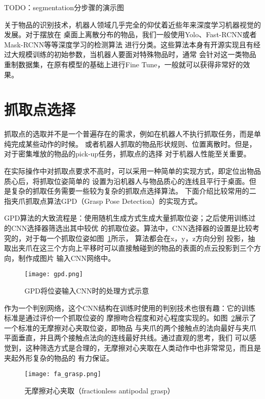 TODO：segmentation分步骤的演示图

关于物品的识别技术，机器人领域几乎完全的仰仗着近些年来深度学习机器视觉的发展。对于摆放在
桌面上离散分布的物品，我们一般使用Yolo、Fast-RCNN或者Mask-RCNN等等深度学习的检测算法
进行分类。这些算法本身有开源实现且有经过大规模训练的初始参数，当机器人要面对特殊物品时，通常
会针对这一类物品重制数据集，在原有模型的基础上进行Fine Tune，一般就可以获得非常好的效果。



\section{抓取点选择}

抓取点的选取并不是一个普遍存在的需求，例如在机器人不执行抓取任务，而是单纯完成某些动作的时候。
或者机器人抓取的物品形状规则、位置离散时。但是，对于密集堆放的物品的pick-up任务，抓取点的选择
对于机器人性能至关重要。

在实际操作中对抓取点要求不高时，可以采用一种简单的实现方式，即定位出物品质心后，将抓取位姿简单的
设置为沿机器人与物品质心的连线且平行于桌面。但是复杂的抓取任务需要一些较为复杂的抓取点选择算法。
下面介绍比较常用的二指夹爪抓取点算法GPD（Grasp Pose Detection）\cite{ten2017grasp}的实现方式。

GPD算法的大致流程是：使用随机生成方式生成大量抓取位姿；之后使用训练过的CNN选择器筛选出其中较优
的抓取位姿。算法中，CNN选择器的设置是比较考究的，对于每一个抓取位姿如图~\ref{fig:gpd}所示，
算法都会在x，y，z方向分别
投影，抽取出夹爪在这三个方向上平移时可以直接触碰到的物品的表面的点云投影到三个方向，制作成图片
输入CNN网络中。

\begin{figure}[h] %
  \centering
  \texttt{[image: gpd.png]}
  \caption{GPD将位姿输入CNN时的处理方式示意}
  \label{fig:gpd}
\end{figure}

作为一个判别网络，这个CNN结构在训练时使用的判别技术也很有趣：它的训练标准是通过评价一个抓取位姿的
摩擦吻合程度和对心程度实现的。如图~\ref{fig:fa_grasp}展示了一个标准的无摩擦对心夹取位姿，即物品
与夹爪的两个接触点的法向最好与夹爪平面垂直，并且两个接触点法向的连线最好共线。通过直观的思考，我们
可以感觉到，这种筛选方式是合理的，无摩擦对心夹取在人类动作中也非常常见，而且是夹起外形复杂的物品的
有力保证。


\begin{figure}[h] %
  \centering
  \texttt{[image: fa\_grasp.png]}
  \caption{无摩擦对心夹取（fractionless antipodal grasp）}
  \label{fig:fa_grasp}
\end{figure}

